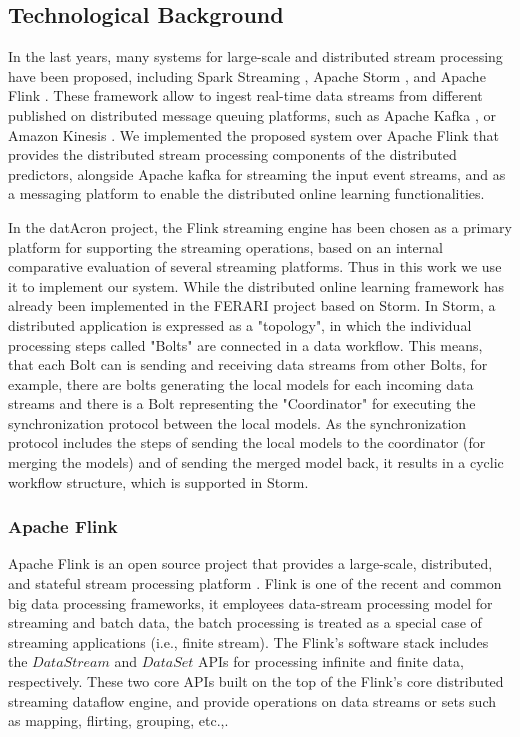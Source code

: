 \subsection{Technological Background}
In the last years, many systems for large-scale and distributed stream processing have been proposed, including Spark Streaming \cite{Spark},  Apache Storm \cite{Storm}, and Apache Flink \cite{Flink}. These framework allow to ingest real-time data streams from different published on distributed message queuing platforms, such as Apache Kafka \cite{Kafka}, or  Amazon Kinesis \cite{Kinesis}. We implemented the proposed system over Apache Flink that provides the distributed stream processing components of the distributed predictors, alongside  Apache kafka for streaming the input event streams, and as a messaging platform to enable the distributed online learning functionalities.


\par In the datAcron project, the Flink streaming engine has been chosen as a primary platform for supporting the streaming operations, based on an internal comparative evaluation of several streaming platforms. Thus in this work we use it to implement our system. While the distributed online learning framework has already been implemented in the FERARI project \cite{flouris2016ferari}  based on Storm. In Storm, a distributed application is expressed as a "topology", in which the individual processing steps called "Bolts" are connected
in a data workflow. This means, that each Bolt can is sending and receiving data streams from other Bolts, for example, there are bolts generating
the local models for each incoming data streams and there is a Bolt representing the "Coordinator" for executing the synchronization protocol between
the local models. As the synchronization protocol includes the steps of sending the local models to the coordinator (for merging the models) and of sending
the merged model back, it results in a cyclic workflow structure, which is supported in Storm. 

\subsubsection*{Apache Flink}

\par Apache Flink is an open source project that provides a large-scale, distributed,  and stateful stream processing platform \cite{carbone2015apache}. Flink is one of the recent and common big data processing frameworks, it employees data-stream processing model for streaming and batch data, the batch processing is treated as a special case of streaming applications (i.e., finite stream). The Flink's software stack includes the  $DataStream$ and $DataSet$ APIs for processing infinite and finite data, respectively. These two core APIs built on the top of the Flink's core distributed streaming dataflow engine, and provide operations on data streams or sets such as mapping, flirting, grouping, etc.,.  

